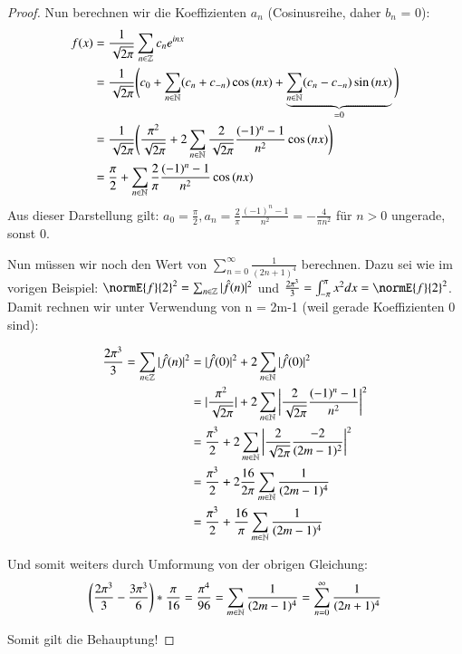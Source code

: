 \begin{proof}
	Nun berechnen wir die Koeffizienten $a_n$ (Cosinusreihe, daher $b_n$ = 0):
	\begin{equation*}
	\begin{split}
	f(x) & = \frac{1}{\sqrt{2\pi}} \sum_{n \in \mathbb{Z}} c_n e^{inx} \\
	& = \frac{1}{\sqrt{2\pi}} \bigg(c_0 + \sum_{n \in \mathbb{N}} (c_n + c_{-n}) \cos{(nx)} +  \underbrace{\sum_{n \in \mathbb{N}} (c_n - c_{-n}) \sin{(nx)}}_{=0} \bigg) \\
	&  = \frac{1}{\sqrt{2\pi}} \bigg( \frac{\pi^2}{\sqrt{2\pi}} + 2 \sum_{n \in \mathbb{N}} \frac{2}{\sqrt{2\pi}} \frac{(-1)^n - 1}{n^2} \cos{(nx)} \bigg) \\
	& = \frac{\pi}{2} + \sum_{n \in \mathbb{N}} \frac{2}{\pi} \frac{(-1)^n - 1}{n^2} \cos{(nx)}
	\end{split}
	\end{equation*}
	Aus dieser Darstellung gilt: $a_0 = \frac{\pi}{2}, a_n = \frac{2}{\pi} \frac{(-1)^n - 1}{n^2} = -\frac{4}{\pi n^2}$ für $n>0$ ungerade, sonst 0.
	
	Nun müssen wir noch den Wert von $\sum_{n=0}^{\infty} \frac{1}{(2n+1)^4}$ berechnen. Dazu sei wie im vorigen Beispiel: $\normE{f}{2}^2 = \sum_{n \in \Z} |\fouriertransform{f}(n)|^2$ und $\frac{2\pi^3}{3} = \int_{-\pi}^{\pi} x^2 dx = \normE{f}{2}^2$. Damit rechnen wir unter Verwendung von n = 2m-1 (weil gerade Koeffizienten 0 sind):
	
	\begin{equation*}
	\begin{split}
	\frac{2\pi^3}{3} = \sum_{n \in \mathbb{Z}} |\hat{f}(n)|^2 & = |\hat{f}(0)|^2 + 2 \sum_{n \in \mathbb{N}} |\hat{f}(0)|^2\\
	& = | \frac{\pi^2}{\sqrt{2\pi}} | + 2 \sum_{n \in \mathbb{N}} \bigg| \frac{2}{\sqrt{2\pi}} \frac{(-1)^n - 1}{n^2} \bigg|^2 \\
	& = \frac{\pi^3}{2} + 2 \sum_{m \in \mathbb{N}} \bigg| \frac{2}{\sqrt{2\pi}} \frac{-2}{(2m-1)^2} \bigg|^2 \\
	& = \frac{\pi^3}{2} + 2 \frac{16}{2\pi} \sum_{m \in \mathbb{N}} \frac{1}{(2m-1)^4} \\
	& = \frac{\pi^3}{2} + \frac{16}{\pi} \sum_{m \in \mathbb{N}} \frac{1}{(2m-1)^4}
	\end{split}	
	\end{equation*}
	
	Und somit weiters durch Umformung von der obrigen Gleichung:
	\begin{equation*}
	\bigg(\frac{2\pi^3}{3} - \frac{3\pi^3}{6} \bigg) * \frac{\pi}{16} = \frac{\pi^4}{96} =  \sum_{m \in \mathbb{N}} \frac{1}{(2m-1)^4} = \sum_{n = 0}^{\infty} \frac{1}{(2n+1)^4}
	\end{equation*}
	
	Somit gilt die Behauptung!

\end{proof}
